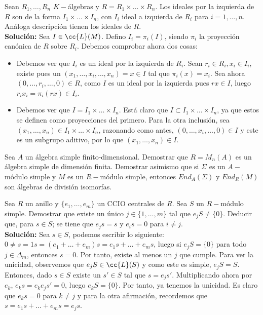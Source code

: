 \begin{ejercicio}
    Sean $R_1,\ldots,R_n$ $K-$álgebras y $R=R_1\times \ldots\times R_n$. Los ideales por la izquierda de $R$ son de la forma $I_1\times \ldots\times I_n$, con $I_i$ ideal a izquierda de $R_i$ para $i = 1,\ldots,n$. Análoga descripción tienen los ideales de $R$. \\
    
    \noindent
    \textbf{Solución:}
    Sea $I \in \cc{L}(M)$. Defino $I_i = \pi_i(I)$, siendo $\pi_i $ la proyección canónica de $R$ sobre $R_i $. Debemos comprobar ahora dos cosas: 
    \begin{itemize}
        \item Debemos ver que $I_i $ es un ideal por la izquierda de $R_i $. Sean $r_i \in R_i, x_i \in I_i $, existe pues un $(x_1,\ldots,x_i,\ldots,x_n)= x \in I$ tal que $\pi_i(x) = x_i$. Sea ahora $(0,\ldots,r_i,\ldots,0) \in R$, como $I$ es un ideal por la izquierda pues $rx \in I$, luego $r_ix_i = \pi_i(rx) \in I_i $.
        \item Debemos ver que $I = I_1 \times \ldots \times I_n$. Está claro que $I \subset I_1 \times \ldots\times I_n$, ya que estos se definen como proyecciones del primero. Para la otra inclusión, sea $(x_1,\ldots,x_n) \in I_1\times\ldots\times I_n$, razonando como antes, $(0,\ldots,x_i,\ldots,0) \in I$ y este es un subgrupo aditivo, por lo que $(x_1,\ldots,x_n) \in I$. 
    \end{itemize}
\end{ejercicio}

\begin{ejerciciostar}
    Sea $A$ un álgebra simple finito-dimensional. Demostrar que $R=M_n(A)$ es un álgebra simple de dimensión finita. Demostrar asimismo que si $\Sigma$ es un $A-$módulo simple y $M$ es un $R-$módulo simple, entonces $End_A(\Sigma)$ y $End_R(M)$ son álgebras de división isomorfas.
\end{ejerciciostar}

\begin{ejercicio}
    Sea $R$ un anillo y $\{e_1,\ldots,e_m\}$ un CCIO centrales de $R$. Sea $S$ un $R-$módulo simple. Demostrar que existe un único $j\in \{1,\ldots,m\}$ tal que $e_jS\neq \{0\}$. Deducir que, para $s\in S$; se tiene que $e_js = s$ y $e_is = 0$ para $i\neq j$. \\
    
    \noindent
    \textbf{Solución:}
    Sea $s \in S$, podemos escribir lo siguiente: $0 \neq s = 1s = (e_1+ \ldots+ e_m) s = e_1s + \ldots + e_ms$, luego si $e_jS = \{0\}$ para todo $j \in \Delta_m$, entonces $s=0$. Por tanto, existe al menos un $j$ que cumple. Para ver la unicidad, observemos que $e_jS \in \cc{L}(S)$ y como este es simple, $e_jS = S$. Entonces, dado $s \in S$ existe un $s' \in S$ tal que $s = e_js'$. Multiplicando ahora por $e_k$, $e_ks = e_ke_js' = 0$, luego $e_kS = \{0\}$. Por tanto, ya tenemos la unicidad. Es claro que $e_ks = 0$ para $k\neq j$ y para la otra afirmación, recordemos que $s = e_1s + \ldots + e_ms = e_js$.
\end{ejercicio}
